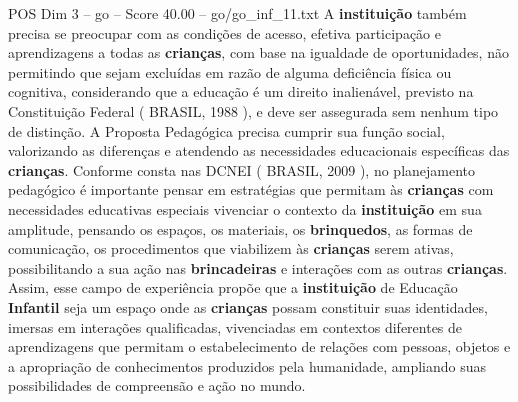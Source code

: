 \begin{textsample}{POS Dim 3 – go – Score 40.00 – go/go\_inf\_11.txt}
A \textbf{instituição} também precisa se preocupar com as condições de acesso, efetiva participação e aprendizagens a todas as \textbf{crianças}, com base na igualdade de oportunidades, não permitindo que sejam excluídas em razão de alguma deficiência física ou cognitiva, considerando que a educação é um direito inalienável, previsto na Constituição Federal ( BRASIL, 1988 ), e deve ser assegurada sem nenhum tipo de distinção.
A Proposta Pedagógica precisa cumprir sua função social, valorizando as diferenças e atendendo as necessidades educacionais específicas das \textbf{crianças}.
Conforme consta nas DCNEI ( BRASIL, 2009 ), no planejamento pedagógico é importante pensar em estratégias que permitam às \textbf{crianças} com necessidades educativas especiais vivenciar o contexto da \textbf{instituição} em sua amplitude, pensando os espaços, os materiais, os \textbf{brinquedos}, as formas de comunicação, os procedimentos que viabilizem às \textbf{crianças} serem ativas, possibilitando a sua ação nas \textbf{brincadeiras} e interações com as outras \textbf{crianças}.
Assim, esse campo de experiência propõe que a \textbf{instituição} de Educação \textbf{Infantil} seja um espaço onde as \textbf{crianças} possam constituir suas identidades, imersas em interações qualificadas, vivenciadas em contextos diferentes de aprendizagens que permitam o estabelecimento de relações com pessoas, objetos e a apropriação de conhecimentos produzidos pela humanidade, ampliando suas possibilidades de compreensão e ação no mundo.

\end{textsample}
